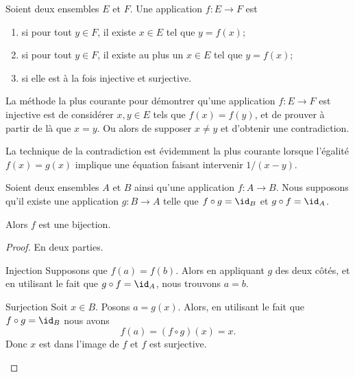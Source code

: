 \begin{definition}
	Soient deux ensembles \( E\) et \( F\). Une application \( f\colon E\to F\) est
	\begin{enumerate}
		\item
		       si pour tout \( y\in F\), il existe \( x\in E\) tel que \( y=f(x)\);
		\item
		       si pour tout \( y\in F\), il existe au plus un \(x\in E \) tel que \( y=f(x)\);
		\item
		       si elle est à la fois injective et surjective.
	\end{enumerate}
\end{definition}
La méthode la plus courante pour démontrer qu'une application \( f\colon E\to F\) est injective est de considérer \( x,y\in E\) tels que \( f(x)=f(y)\), et de prouver à partir de là que \( x=y\). Ou alors de supposer \( x\neq y\) et d'obtenir une contradiction.

La technique de la contradiction est évidemment la plus courante lorsque l'égalité \( f(x)=g(x)\) implique une équation faisant intervenir \( 1/(x-y)\).

\begin{lemma}       \label{LEMooWBYSooFqyqQP}
	Soient deux ensembles \( A\) et \( B\) ainsi qu'une application \( f\colon A\to B\). Nous supposons qu'il existe une application \( g\colon B\to A\) telle que \( f\circ g=\id_B\) et \( g\circ f=\id_A\).

	Alors \( f\) est une bijection.
\end{lemma}

\begin{proof}
	En deux parties.
	\begin{subproof}
		\item[Injection]
		Supposons que \( f(a)=f(b)\). Alors en appliquant \( g\) des deux côtés, et en utilisant le fait que \( g\circ f=\id_A\), nous trouvons \( a=b\).
		\item[Surjection]
		Soit \( x\in B\). Posons \( a=g(x)\). Alors, en utilisant le fait que \( f\circ g=\id_B\) nous avons
		\begin{equation}
			f(a)=(f\circ g)(x)=x.
		\end{equation}
		Donc \( x\) est dans l'image de \( f\) et \( f\) est surjective.
	\end{subproof}
\end{proof}

